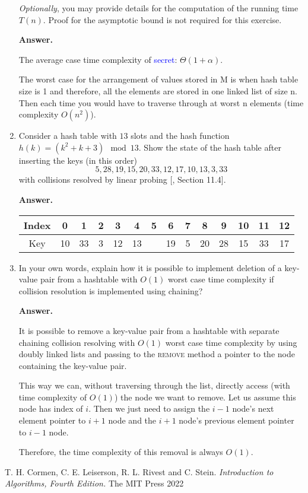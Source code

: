 \documentclass{article}
\begin{document}
\begin{enumerate}
    \textit{Optionally}, you may provide details for the computation of the running time $T(n)$. Proof for the asymptotic bound is not required for this exercise.

    \textbf{Answer.}

    The average case time complexity of \textcolor{blue}{secret}: $\Theta(1 + \alpha)$.

    The worst case for the arrangement of values stored in M is when hash table size is 1 and therefore, all the elements are stored in one linked list of size n. Then each time you would have to traverse through at worst n elements (time complexity $O(n^2)$).

    \item Consider a hash table with $13$ slots and the hash function $h(k) = (k^2 + k + 3) \mod 13$. Show the state of the hash table after inserting the keys (in this order)
    \[5, 28, 19, 15, 20, 33, 12, 17, 10, 13, 3, 33\]
    with collisions resolved by linear probing [, Section 11.4].

    \textbf{Answer.}
    
    \begin{center}
    \begin{tabular}{|c|c|c|c|c|c|c|c|c|c|c|c|c|c|}
        \hline
        Index & 0 & 1 & 2 & 3 & 4 & 5 & 6 & 7 & 8 & 9 & 10 & 11 & 12 \\
        \hline
        Key & 10 & 33 & 3 & 12 & 13 &  & 19 & 5 & 20 & 28 & 15 & 33 & 17 \\
        \hline
    \end{tabular}
    \end{center}

    \item In your own words, explain how it is possible to implement deletion of a key-value pair from a hashtable with $O(1)$ worst case time complexity if collision resolution is implemented using chaining?

    \textbf{Answer.} 

    It is possible to remove a key-value pair from a hashtable with separate chaining collision resolving with $O(1)$ worst case time complexity by using doubly linked lists and passing to the \textsc{remove} method a pointer to the node containing the key-value pair.

    This way we can, without traversing through the list, directly access (with time complexity of $O(1)$) the node we want to remove. Let us assume this node has index of $i$. Then we just need to assign the $i - 1$ node's next element pointer to $i + 1$ node and the $i + 1$ node's previous element pointer to $i - 1$ node.

    Therefore, the time complexity of this removal is always $O(1)$.
    
\end{enumerate}

\begin{thebibliography}{9}
  T. H. Cormen, C. E. Leiserson, R. L. Rivest and C. Stein.
  \textit{Introduction to Algorithms, Fourth Edition.}
  The MIT Press
  2022
\end{thebibliography}
\end{document}
